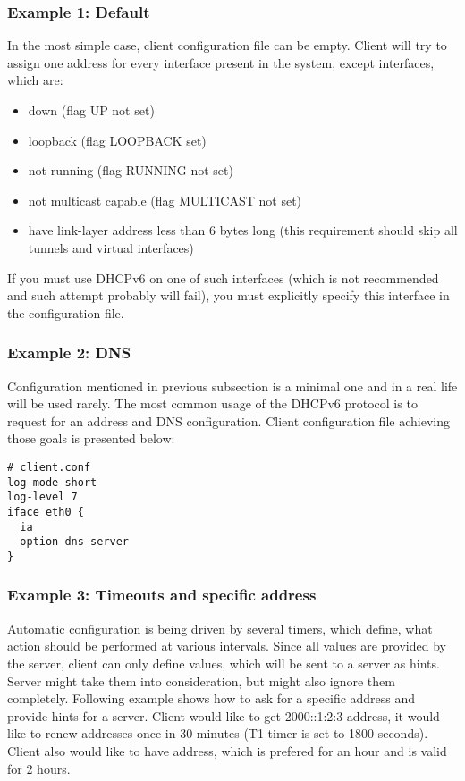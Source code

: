 \subsubsection{Example 1: Default}
In the most simple case, client configuration file can be empty. Client will try to
assign one address for every interface present in the system, except
interfaces, which are:
\begin{itemize}
\item down (flag UP not set)
\item loopback (flag LOOPBACK set)
\item not running (flag RUNNING not set)
\item not multicast capable (flag MULTICAST not set)
\item have link-layer address less than 6 bytes long (this requirement
      should skip all tunnels and virtual interfaces)
\end{itemize}

If you must use DHCPv6 on one of such interfaces (which is not
recommended and such attempt probably will fail), you must explicitly
specify this interface in the configuration file.

\subsubsection{Example 2: DNS}
Configuration mentioned in previous subsection is a minimal one and in a
real life will be used rarely. The most common usage of the DHCPv6
protocol is to request for an address and DNS configuration. Client
configuration file achieving those goals is presented below:
\begin{lstlisting}
# client.conf
log-mode short
log-level 7
iface eth0 {
  ia
  option dns-server
}
\end{lstlisting}

\subsubsection{Example 3: Timeouts and specific address}

Automatic configuration is being driven by several timers, which define,
what action should be performed at various intervals. Since all
values are provided by the server, client can only define values, which
will be sent to a server as hints. Server might take them into
consideration, but might also ignore them
completely. Following example shows how to ask for a specific address
and provide hints for a server. Client would like to get 2000::1:2:3
address, it would like to renew addresses once in 30 minutes (T1 timer
is set to 1800 seconds). Client also would like to have address, which
is prefered for an hour and is valid for 2 hours. 


